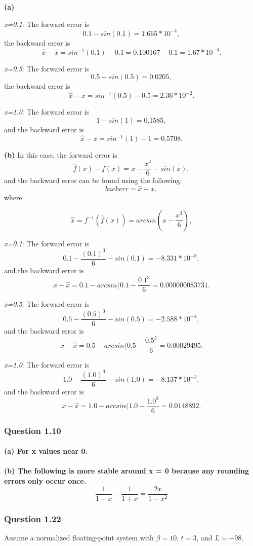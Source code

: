 \documentclass{article}
\begin{document}
\textbf{(a)}

\textit{x=0.1}: The forward error is $$0.1 - sin(0.1) = 1.665*10^{-4},$$
the backward error is $$\hat{x} -x = sin^{-1}(0.1) -0.1 = 0.100167 - 0.1 = 
1.67*10^{-4}.$$


\textit{x=0.5}: The forward error is $$0.5 - sin(0.5) = 0.0205,$$ the backward 
error is
$$\hat{x} -x = sin^{-1}(0.5) - 0.5 = 2.36 * 10^{-2}.$$


\textit{x=1.0}: The forward error is $$1 - sin(1) = 0.1585,$$ and the backward 
error is $$\hat{x}-x=sin^{-1}(1) - 1 = 0.5708.$$

\textbf{(b)}
In this case, the forward error is $$\hat{f}(x) - f(x) = x-\frac{x^{3}}{6} - 
sin(x),$$
and the backward error can be found using the following:
$$backerr = \hat{x} - x,$$
where

$$\hat{x} = f^{-1}(\hat{f}(x)) = arcsin(x - \frac{x^{3}}{6}),$$

\textit{x=0.1}: The forward error is $$0.1-\frac{(0.1)^{3}}{6} - sin(0.1)= 
-8.331*10^{-8},$$ and the backward error is $$x - \hat{x} = 0.1 - arcsin(0.1 - 
\frac{0.1^3}{6} = 0.000000083731.$$

\textit{x=0.5}: The forward error is $$0.5-\frac{(0.5)^{3}}{6} - sin(0.5)= 
-2.588*10^{-4},$$  and the backward error is $$x - \hat{x} = 0.5 - arcsin(0.5 - 
\frac{0.5^3}{6} = 0.00029495.$$

\textit{x=1.0}: The forward error is $$1.0-\frac{(1.0)^{3}}{6}- sin(1.0) = 
-8.137*10^{-3},$$ and the backward error is $$x - \hat{x} = 1.0 - arcsin(1.0 - 
\frac{1.0^3}{6} = 0.0148892.$$

\subsubsection{Question 1.10}

\paragraph{\textbf{(a)} For x values near 0.}
\paragraph{\textbf{(b)} The following is more stable around x = 0 because any 
rounding errors only occur once.
$$\frac{1}{1-x} - \frac{1}{1+x} = \frac{2x}{1- x^2}$$}


\subsubsection{Question 1.22}
Assume a normalized floating-point system with $\beta{} = 10$, $t = 3$, and
$L = -98$.
\end{document}
